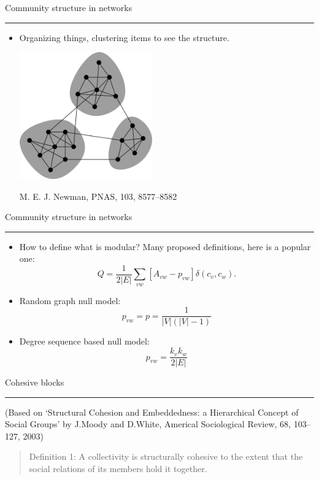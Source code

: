 \documentclass[landscape,fleqno]{foils}
\newcommand{\stitle}[1]{{\color{blue}\Large #1\par\vspace*{10pt}\hrule}}
\newenvironment{narrow}[2]{%
  \begin{list}{}{%
      \setlength{\topsep}{0pt}%
      \setlength{\leftmargin}{#1}%
      \setlength{\rightmargin}{#2}%
      \setlength{\listparindent}{\parindent}%
      \setlength{\itemindent}{\parindent}%
      \setlength{\parsep}{\parskip}}%
    \item[]}{\end{list}}
\begin{document}
\newpage
\stitle{Community structure in networks}
\begin{narrow}{0cm}{15cm}
\begin{itemize}
\item Organizing things, clustering items to see the structure.
\begin{center}
\includegraphics[width=0.45\textwidth]{commstr}\\[15pt]
{\tiny M. E. J. Newman, PNAS, 103, 8577--8582\par }
\end{center}
\end{itemize}
\end{narrow}

\newpage
\stitle{Community structure in networks}
\begin{narrow}{0cm}{15cm}
\begin{itemize}
\item How to define what is modular? Many proposed definitions, here
  is a popular one:
  \[ Q = \frac1{2|E|}\sum_{vw} [A_{vw} - p_{vw} ]\delta(c_v,c_w). \] \pause
\item Random graph null model: 
  \[ p_{vw} = p = \frac{1}{|V|(|V|-1)} \] \pause
\item Degree sequence based null model:
  \[ p_{vw} = \frac{k_vk_w}{2|E|} \]
\end{itemize}
\end{narrow}


\newpage
\stitle{Cohesive blocks}
(Based on `Structural Cohesion and Embeddedness: a Hierarchical
Concept of Social Groups' by J.Moody and D.White, Americal
Sociological Review, 68, 103--127, 2003)

\begin{quotation}
Definition 1: A collectivity is structurally cohesive to the extent
that the social relations of its members hold it together. 
\end{quotation} \pause\vspace*{-0.8cm}
\end{document}
